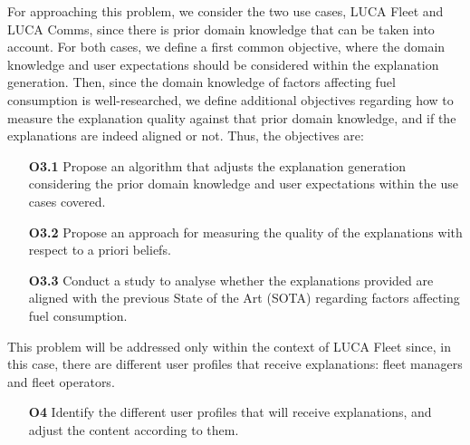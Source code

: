 For approaching this problem, we consider the two use cases, LUCA Fleet and LUCA Comms, since there is prior domain knowledge that can be taken into account. For both cases, we define a first common objective, where the domain knowledge and user expectations should be considered within the explanation generation. Then, since the domain knowledge of factors affecting fuel consumption is well-researched, we define additional objectives regarding how to measure the explanation quality against that prior domain knowledge, and if the explanations are indeed aligned or not.
Thus, the objectives are:
\begin{itemize}
    \item[\textbf{O3.1}] Propose an algorithm that adjusts the explanation generation considering the prior domain knowledge and user expectations within the use cases covered.
    \item[\textbf{O3.2}] Propose an approach for measuring the quality of the explanations with respect to a priori beliefs.
    \item[\textbf{O3.3}] Conduct a study to analyse whether the explanations provided are aligned with the previous State of the Art (SOTA) regarding factors affecting fuel consumption.
\end{itemize}


This problem will be addressed only within the context of LUCA Fleet since, in this case, there are different user profiles that receive explanations: fleet managers and fleet operators.
\begin{itemize}
    \item[\textbf{O4}] Identify the different user profiles that will receive explanations, and adjust the content according to them.
\end{itemize}


